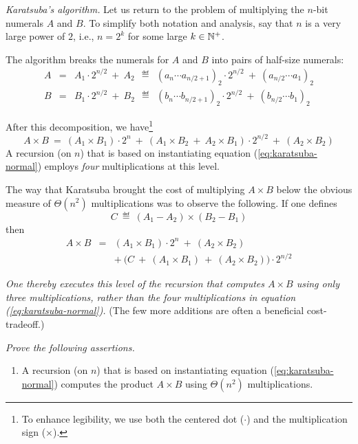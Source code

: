 \begin{enumerate}
\textit{Karatsuba's algorithm.}
Let us return to the problem of multiplying the $n$-bit numerals $A$ and $B$.  To simplify both notation and analysis, say that $n$ is a very large power of $2$, i.e., $n=2^k$ for some large $k \in \mathbb{N}^+$.

\smallskip

The algorithm breaks the numerals for $A$ and $B$ into pairs of half-size numerals:
\begin{eqnarray*}
A & = & A_1 \cdot 2^{n/2} \ + \ A_2 \ \ 
 \eqdef  \ \ (a_n \cdots a_{n/2+1})_2 \cdot 2^{n/2} \ + \ (a_{n/2} \cdots a_1)_2 \\
B & = & B_1 \cdot 2^{n/2} \ + \  B_2 \ \
  \eqdef  \ \ (b_n \cdots b_{n/2+1})_2 \cdot 2^{n/2} \ + \ (b_{n/2} \cdots b_1)_2
\end{eqnarray*}

After this decomposition, we have\footnote{To enhance legibility, we use both the centered dot ($\cdot$) and the multiplication sign ($\times$).}
\begin{equation}
\label{eq:karatsuba-normal}
A \times B \ = \ (A_1 \times B_1) \cdot 2^n \ + \  (A_1 \times B_2 \ + \ A_2 \times B_1) \cdot 2^{n/2} \ + \ (A_2 \times B_2)
\end{equation}
A recursion (on $n$) that is based on instantiating equation (\ref{eq:karatsuba-normal}) employs {\em four} multiplications at this level.

\smallskip

The way that Karatsuba brought the cost of multiplying $A \times B$ below the obvious measure of $\Theta(n^2)$ multiplications was to observe the following.  If one defines
\[ C \ \eqdef \ (A_1 - A_2) \times (B_2 - B_1) \]
then
\begin{eqnarray*}
A \times B & = & (A_1 \times B_1) \cdot 2^n \ + \ (A_2 \times B_2) \\
                 &    & + \ \big(C \ + \ (A_1 \times B_1) \ + \ (A_2 \times B_2) \big) \cdot 2^{n/2}
\end{eqnarray*}

{\em One thereby executes this level of the recursion that computes $A \times B$ using only {\em three} multiplications, rather than the four multiplications in equation (\ref{eq:karatsuba-normal}).}  (The few more additions are often a beneficial cost-tradeoff.)

\medskip

{\em Prove the following assertions.
\begin{enumerate}
\item
A recursion (on $n$) that is based on instantiating equation (\ref{eq:karatsuba-normal}) computes the product $A \times B$ using $\Theta(n^2)$ multiplications.


\end{enumerate}}
\end{enumerate}

